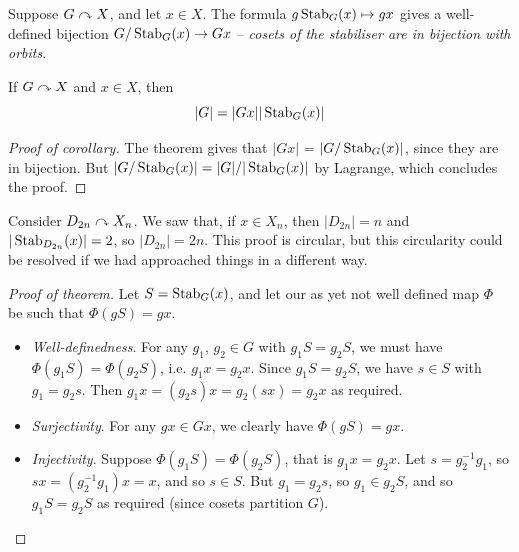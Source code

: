 \documentclass{../template/note}
\begin{document}
    \begin{theorem}
        Suppose \(G \curvearrowright X\), and let \(x \in X\). The formula \(g \operatorname{Stab}_G(x) \mapsto gx\) gives a well-defined bijection \(G/\operatorname{Stab}_G(x) \to Gx\) -- \emph{cosets of the stabiliser are in bijection with orbits}.
    \end{theorem}
    
    \begin{corollary}
        If \(G \curvearrowright X\) and \(x \in X\), then
        \[
            |G| = |Gx||\operatorname{Stab}_G(x)|
        \]
        \label{orbit-stabiliser-theorem}
    \end{corollary}
    
    \begin{proof}[Proof of corollary]
        The theorem gives that \(|Gx|\) = \(|G/\operatorname{Stab}_G(x)|\), since they are in bijection. But \(|G/\operatorname{Stab}_G(x)| = |G|/|\operatorname{Stab}_G(x)|\) by Lagrange, which concludes the proof.
    \end{proof}
    
    \begin{example*}
        Consider \(D_{2n} \curvearrowright X_n\). We saw that, if \(x \in X_n\), then \(|D_{2n}| = n\) and \(|\operatorname{Stab}_{D_{2n}}(x)| = 2\), so \(|D_{2n}| = 2n\). This proof is circular, but this circularity could be resolved if we had approached things in a different way.
    \end{example*}
    
    \begin{proof}[Proof of theorem]
        Let \(S = \operatorname{Stab}_G(x)\), and let our as yet not well defined map \(\Phi\) be such that \(\Phi(gS) = gx\).
        \begin{itemize}
            \item \emph{Well-definedness}. For any \(g_1\), \(g_2 \in G\) with \(g_1S = g_2S\), we must have \(\Phi(g_1S) = \Phi(g_2S)\), i.e. \(g_1x = g_2x\). Since \(g_1S = g_2S\), we have \(s \in S\) with \(g_1 = g_2s\). Then \(g_1x = (g_2s)x = g_2(sx) = g_2x\) as required.
            \item \emph{Surjectivity}. For any \(gx \in Gx\), we clearly have \(\Phi(gS) = gx\).
            \item \emph{Injectivity}. Suppose \(\Phi(g_1S) = \Phi(g_2S)\), that is \(g_1x = g_2x\). Let \(s = g_2^{-1}g_1\), so \(sx = (g_2^{-1}g_1)x = x\), and so \(s \in S\). But \(g_1 = g_2s\), so \(g_1 \in g_2S\), and so \(g_1S = g_2S\) as required (since cosets partition \(G\)).
        \end{itemize}
    \end{proof}
    
\end{document}
